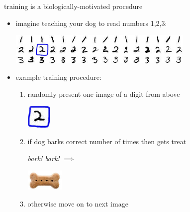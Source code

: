\documentclass[xcolor={svgnames},
               hyperref={colorlinks,citecolor=DeepPink4,linkcolor=FireBrick,urlcolor=Maroon}]
               {beamer}
\begin{document}
\begin{frame}{training is a biologically-motivated procedure}

\begin{itemize}
\item imagine teaching your dog to read numbers 1,2,3:
\begin{center}
\includegraphics[width=0.7\textwidth]{figs/onetwothree}
\end{center}
\item example training procedure:
    \begin{enumerate}
    \item randomly present one image of a digit from above
\begin{center}
\includegraphics[width=0.1\textwidth]{figs/two} \phantom{dlasbj sadkf adsk}
\end{center}
    \item if dog barks correct number of times then gets treat

\vspace{5mm}
\hspace{10mm} \emph{bark! bark!} \qquad $\implies$

\vspace{-6mm}
\hfill \includegraphics[width=0.15\textwidth]{figs/dogtreat} \hspace{25mm} \phantom{boo}
    \item otherwise move on to next image
    \end{enumerate}
\end{itemize}
\end{frame}
\end{document}
